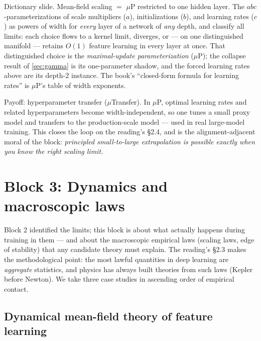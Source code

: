 \documentclass[11pt]{article}
\begin{document}
\begin{callout}[note]
Dictionary slide. Mean-field scaling $=$ $\mu$P restricted to one hidden
layer. The $abc$-parameterizations of \cite{yang2021tensor} scale
multipliers ($a$), initializations ($b$), and learning rates ($c$) as
powers of width for \emph{every} layer of a network of \emph{any} depth,
and classify all limits: each choice flows to a kernel limit, diverges, or
--- on one distinguished manifold --- retains $O(1)$ feature learning in
every layer at once. That distinguished choice is the \emph{maximal-update
parameterization} ($\mu$P); the collapse result of \cref{sec:gamma} is its
one-parameter shadow, and the forced learning rates above are its depth-2
instance. The book's ``closed-form formula for learning rates'' is $\mu$P's
table of width exponents.
\end{callout}

\begin{callout}[tip]
Payoff: hyperparameter transfer ($\mu$Transfer). In $\mu$P, optimal
learning rates and related hyperparameters become width-independent, so one
tunes a small proxy model and transfers to the production-scale model
\cite{yang2022tensor} --- used in real large-model training. This closes the
loop on the reading's \S2.4, and is the alignment-adjacent moral of the
block: \emph{principled small-to-large extrapolation is possible exactly
when you know the right scaling limit.}
\end{callout}

\section{Block 3: Dynamics and macroscopic laws}
\label{sec:block3}

Block 2 identified the limits; this block is about what actually happens
during training in them --- and about the macroscopic empirical laws
(scaling laws, edge of stability) that any candidate theory must explain.
The reading's \S2.3 makes the methodological point: the most lawful
quantities in deep learning are \emph{aggregate} statistics, and physics has
always built theories from such laws (Kepler before Newton). We take three
case studies in ascending order of empirical contact.

\subsection{Dynamical mean-field theory of feature learning}
\label{sec:dmft}
\end{document}
